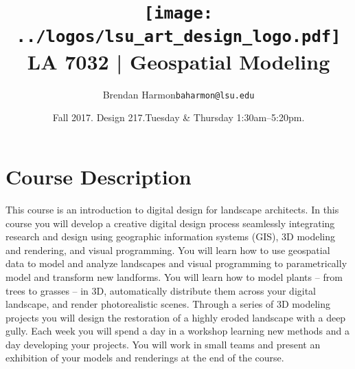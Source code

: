 \documentclass[11pt,article,oneside]{memoir}
\makeatletter
\def\myauthor{Author}
\def\mytitle{Title}
\def\myemail{baharmon@lsu.edu}
\def\myauthor{Brendan Harmon}
\def\mytitle{ \texttt{[image: ../logos/lsu\_art\_design\_logo.pdf]} \\[0.1cm] {\normalfont \normalsize LA 7032 |} \Large Geospatial Modeling}
\newcommand{\globalcolor}[1]{%
  \color{#1}\global\let\default@color\current@color
}
\makeatother
\begin{document}
\setlength\bibitemsep{0.75em}

\setmainfont{Lato Regular}
\setmonofont[Scale=0.8]{IBM Plex Mono}

\def\ind{\hangindent=1 true cm\hangafter=1 \noindent}
\def\labelitemi{$\cdot$}
\title{\LARGE \mytitle}     
\author{\Large\myauthor \newline \footnotesize\texttt{\noindent\myemail}}
\date{Fall 2017. Design 217.\newline Tuesday \& Thursday 1:30am--5:20pm.}
\published{\,}


\globalcolor{black}
\vspace*{-10em}
\maketitle
{}
\clearpage


\globalcolor{black}
\vspace*{-10em}
\maketitle

\section{Course Description}

This course is an introduction to digital design for landscape architects. 
%
In this course you will develop a creative digital design process 
seamlessly integrating research and design
using geographic information systems (GIS),
3D modeling and rendering, and
visual programming. 
%
You will learn how to use geospatial data 
to model and analyze landscapes
and visual programming to 
parametrically model and transform new landforms. 
%
You will learn how to model plants -- from trees to grasses -- in 3D, 
automatically distribute them across your digital landscape,
and render photorealistic scenes. 
%
Through a series of 3D modeling projects you will 
design the restoration of a highly eroded landscape with a deep gully.
%
Each week you will spend a day in a workshop
learning new methods
and a day developing your projects.
%
You will work in small teams and present an exhibition of your
models and renderings at the end of the course.\\
\end{document}
